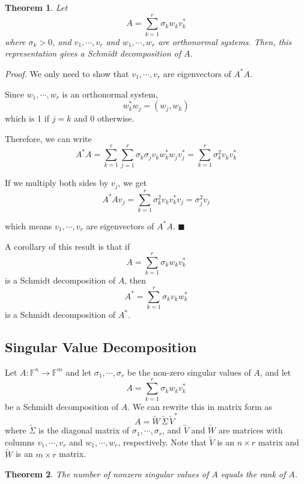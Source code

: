 \documentclass[a4paper,10pt]{book}
\newcommand{\F}{\mathbb{F}}
\theoremstyle{plain}
\newtheorem{theorem}{Theorem}[section]
\renewenvironment{proof}{\textsl{Proof.}}{\hfill$\blacksquare$}
\theoremstyle{plain}
\theoremstyle{definition}
\begin{document}
\begin{theorem}
Let
$$A = \sum_{k=1}^{r} \sigma_{k} w_{k} v_{k}^{*}$$
where $\sigma_{k} > 0$, and $v_{1}, \cdots, v_{r}$ and $w_{1}, \cdots, w_{r}$ are orthonormal systems. Then, this representation gives a Schmidt decomposition of $A$. 
\end{theorem}

\begin{proof}
We only need to show that $v_{1}, \cdots, v_{r}$ are eigenvectors of $A^{*}A$. 

Since $w_{1}, \cdots, w_{r}$ is an orthonormal system, 
$$w_{k}^{*} w_{j} = (w_{j}, w_{k})$$ 
which is 1 if $j = k$ and 0 otherwise. 

Therefore, we can write 
$$A^{*} A = \sum_{k=1}^{r} \sum_{j=1}^{r} \sigma_{k} \sigma_{j}    v_{k} w_{k}^{*} w_{j} v_{j}^{*} = \sum_{k=1}^{r} \sigma_{k}^{2} v_{k} v_{k}^{*}$$

If we multiply both sides by $v_{j}$, we get 
$$A^{*} A v_{j} = \sum_{k=1}^{r} \sigma_{k}^{2} v_{k} v_{k}^{*}v_{j} = \sigma_{j}^{2} v_{j}$$

which means $v_{1}, \cdots, v_{r}$ are eigenvectors of $A^{*} A$. 
\end{proof}

A corollary of this result is that if 
$$A = \sum_{k=1}^{r} \sigma_{k} w_{k} v_{k}^{*}$$
is a Schmidt decomposition of $A$, then 
$$A^{*} = \sum_{k=1}^{r} \sigma_{k} v_{k} w_{k}^{*}$$
is a Schmidt decomposition of $A^{*}$. 

\subsection{Singular Value Decomposition}

Let $A : \F^{n} \rightarrow \F^{m}$ and let $\sigma_{1}, \cdots, \sigma_{r}$ be the non-zero singular values of $A$, and let 
$$A = \sum_{k=1}^{r} \sigma_{k} w_{k} v_{k}^{*}$$ 
be a Schmidt decomposition of $A$. We can rewrite this in matrix form as 
$$A = \widetilde{W} \, \widetilde{\Sigma} \, \widetilde{V}^{*}$$
where $\widetilde{\Sigma}$ is the diagonal matrix of $\sigma_{1}, \cdots, \sigma_{r}$, and $\widetilde{V}$ and $\widetilde{W}$ are matrices with columns $v_{1}, \cdots, v_{r}$ and $w_{1}, \cdots, w_{r}$, respectively. Note that $\widetilde{V}$ is an $n \times r$ matrix and $\widetilde{W}$ is an $m \times r$ matrix. 

\begin{theorem}
The number of nonzero singular values of $A$ equals the rank of $A$.
\end{theorem}
\end{document}

